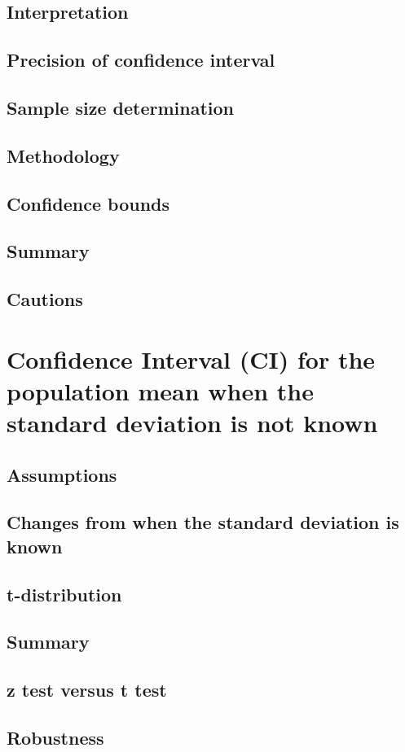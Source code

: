 \subsection{Interpretation}  %
\subsection{Precision of confidence interval}  %
\subsection{Sample size determination}  %
\subsection{Methodology}  %
\subsection{Confidence bounds}  %
\subsection{Summary}  %
\subsection{Cautions}  %

\section{Confidence Interval (CI) for the population mean when the standard deviation is not known}  %
\subsection{Assumptions}  %
\subsection{Changes from when the standard deviation is known}  %
\subsection{t-distribution}  %
\subsection{Summary}  %
\subsection{z test versus t test}  %
\subsection{Robustness}  %
